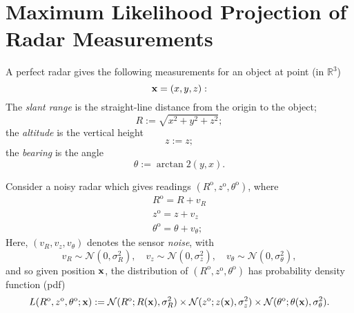 \documentclass[a4paper,10pt]{article}
\date{2011-01-26}
\begin{document}
\newcommand{\onehalf}{\frac{1}{2}}
%
\newcommand{\obs}{\text{o}}
\newcommand{\noise}{v}
\newcommand{\noisevar}{\sigma^2}
\newcommand{\normpdf}{{\mathcal N}}

\newcommand{\reals}{{\mathbb R}}

\newcommand{\pos}{{\bf x}}
\newcommand{\xvar}{x}
\newcommand{\yvar}{y}
\newcommand{\zvar}{z}
\newcommand{\slrange}{R}
\newcommand{\altitude}{\zvar}
\newcommand{\bearing}{\theta}

\newcommand{\likelihood}{L}

\newcommand{\argmin}{\operatorname*{arg\,min}}
\newcommand{\argmax}{\operatorname*{arg\,max}}




\section{Maximum Likelihood Projection of Radar Measurements}


A perfect radar gives the following measurements for an object at point (in $\reals^3$)
\[ \pos = (\xvar,\yvar,\zvar): \]
%
The \emph{slant range} is the straight-line distance from the origin to the object;
\[
  \slrange := \sqrt{ \xvar^2 + \yvar^2 + \zvar^2 } ;
\]
the \emph{altitude} is the vertical height
\[ \zvar := \zvar; \]
the \emph{bearing} is the angle
\[ \bearing := \arctan2(\yvar,\xvar). \]

\newcommand{\obstuple}{{(\slrange^\obs,\altitude^\obs,\bearing^\obs)}}
\newcommand{\noisetuple}{{(\noise_\slrange,\noise_\altitude,\noise_\bearing)}}

Consider a noisy radar which gives readings $\obstuple$,
where
\[
\begin{aligned}
  \slrange^\obs = \slrange + \noise_\slrange	\\
  \altitude^\obs = \altitude + \noise_\altitude	\\
  \bearing^\obs = \bearing + \noise_\bearing;
\end{aligned}
\]
%
Here, $\noisetuple$ denotes the sensor \emph{noise}, with
\[
  \noise_\slrange \sim \normpdf(0,\noisevar_\slrange),
  \quad
  \noise_\altitude \sim \normpdf(0,\noisevar_\altitude),
  \quad
  \noise_\bearing \sim \normpdf(0,\noisevar_\bearing),
\]
and so given position $\pos$, the distribution of $\obstuple$
has probability density function (pdf)
\[
  \likelihood(\slrange^\obs,\altitude^\obs,\bearing^\obs ; \pos ) :=
  \normpdf( \slrange^\obs ; \slrange(\pos), \noisevar_\slrange )
  \times
  \normpdf( \altitude^\obs ; \altitude(\pos), \noisevar_\altitude )
  \times
  \normpdf( \bearing^\obs ; \bearing(\pos), \noisevar_\bearing ).
\]
\end{document}
